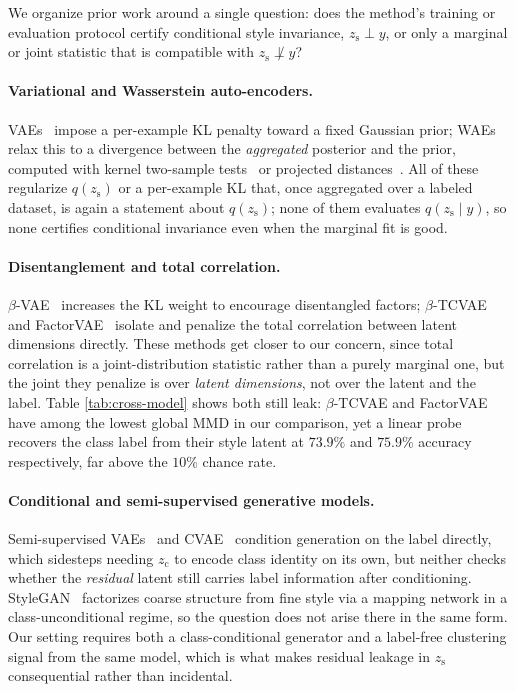 \documentclass[10pt,letterpaper]{article}
\newcommand{\zc}{z_{\mathrm{c}}}
\newcommand{\zs}{z_{\mathrm{s}}}
\begin{document}
We organize prior work around a single question: does the method's training
or evaluation protocol certify conditional style invariance, $\zs\perp y$,
or only a marginal or joint statistic that is compatible with $\zs\not\perp
y$?

\paragraph{Variational and Wasserstein auto-encoders.}
VAEs~\citep{kingma2013autoencoding} impose a per-example KL penalty toward a
fixed Gaussian prior; WAEs~\citep{tolstikhin2017wasserstein} relax this to a
divergence between the \emph{aggregated} posterior and the prior, computed
with kernel two-sample tests~\citep{gretton2012kernel} or projected
distances~\citep{kolouri2018sliced}. All of these regularize $q(\zs)$ or a
per-example KL that, once aggregated over a labeled dataset, is again a
statement about $q(\zs)$; none of them evaluates $q(\zs\mid y)$, so none
certifies conditional invariance even when the marginal fit is good.

\paragraph{Disentanglement and total correlation.}
$\beta$-VAE~\citep{higgins2017beta} increases the KL weight to encourage
disentangled factors; $\beta$-TCVAE~\citep{chen2018isolating} and
FactorVAE~\citep{kim2018disentangling} isolate and penalize the total
correlation between latent dimensions directly. These methods get closer to
our concern, since total correlation is a joint-distribution statistic
rather than a purely marginal one, but the joint they penalize is over
\emph{latent dimensions}, not over the latent and the label. Table
\ref{tab:cross-model} shows both still leak: $\beta$-TCVAE and FactorVAE
have among the lowest global MMD in our comparison, yet a linear probe
recovers the class label from their style latent at $73.9\%$ and $75.9\%$
accuracy respectively, far above the $10\%$ chance rate.

\paragraph{Conditional and semi-supervised generative models.}
Semi-supervised VAEs~\citep{kingma2014semi} and
CVAE~\citep{sohn2015learning} condition generation on the label directly,
which sidesteps needing $\zc$ to encode class identity on its own, but
neither checks whether the \emph{residual} latent still carries label
information after conditioning. StyleGAN~\citep{karras2019style} factorizes
coarse structure from fine style via a mapping network in a
class-unconditional regime, so the question does not arise there in the
same form. Our setting requires both a class-conditional generator and a
label-free clustering signal from the same model, which is what makes
residual leakage in $\zs$ consequential rather than incidental.
\end{document}
